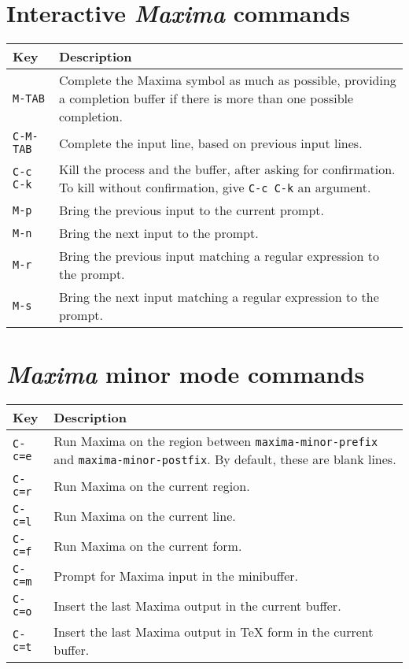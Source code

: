 \documentclass{article}
\newcommand{\mx}{\textsl{\sffamily Maxima}}
\newcommand{\hyph}{-\hspace{0pt}}
\begin{document}
\section{Interactive \mx{} commands}
\label{app:intmx}

\smallskip

\begin{tabular}{p{\firstcol}p{\secondcol}}
\hline
\textbf{Key} & \textbf{Description}\\
\hline
\texttt{M-TAB} & Complete the Maxima symbol as much as possible, providing
     a completion buffer if there is more than one possible
     completion.\\
\texttt{C-M-TAB} & Complete the input line, based on previous input lines.\\
\texttt{C-c C-k} & Kill the process and the buffer, after asking for
  confirmation.  To kill without confirmation, give \texttt{C-c C-k} an
  argument.\\
\texttt{M-p} & Bring the previous input to the current prompt.\\
\texttt{M-n} & Bring the next input to the prompt.\\
\texttt{M-r} & Bring the previous input matching
  a regular expression to the prompt.\\
\texttt{M-s} & Bring the next input matching
  a regular expression to the prompt.
\end{tabular}

\section{\mx{} minor mode commands}
\label{app:intmxmin}

\smallskip

\begin{tabular}{p{\firstcol}p{\secondcol}}
\hline
\textbf{Key} & \textbf{Description}\\
\hline
\texttt{C-c=e} & Run Maxima on the region between
\texttt{maxima\hyph{}minor\hyph{}prefix} and \texttt{maxima\hyph{}minor\hyph{}postfix}.  By
default, these are blank lines.\\
\texttt{C-c=r} & Run Maxima on the current region. \\
\texttt{C-c=l} & Run Maxima on the current line.\\
\texttt{C-c=f} & Run Maxima on the current form.\\
\texttt{C-c=m} & Prompt for Maxima input in the minibuffer.\\
\texttt{C-c=o} & Insert the last Maxima output in the current
buffer.\\
\texttt{C-c=t} & Insert the last Maxima output in \TeX{} form in the
current buffer.
\end{tabular}
\end{document}
